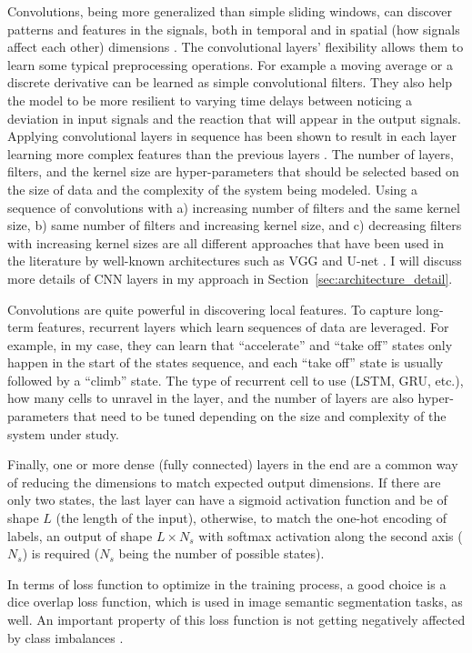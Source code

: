 Convolutions, being more generalized than simple sliding windows, can discover patterns and features in the signals, both in temporal and in spatial (how signals affect each other) dimensions \cite{wang2017time}. 
The convolutional layers' flexibility allows them to learn some typical preprocessing operations. For example a moving average or a discrete derivative can be learned as simple convolutional filters. They also help the model to be more resilient to varying time delays between noticing a deviation in input signals and the reaction that will appear in the output signals. Applying convolutional layers in sequence has been shown to result in each layer learning more complex features than the previous layers \cite{zeiler2014visualizing}.
The number of layers, filters, and the kernel size are hyper-parameters that should be selected based on the size of data and the complexity of the system being modeled.
Using a sequence of convolutions with a) increasing number of filters and the same kernel size, b) same number of filters and increasing kernel size, and c) decreasing filters with increasing kernel sizes are all different approaches that have been used in the literature by well-known architectures such as VGG and U-net \cite{simonyan2014very, ronneberger2015u}. 
I will discuss more details of CNN layers in my approach in Section~\ref{sec:architecture_detail}.

Convolutions are quite powerful in discovering local features. To capture long-term features, recurrent layers which learn sequences of data are leveraged. For example, in my case, they can learn that ``accelerate'' and ``take off'' states only happen in the start of the states sequence, and each ``take off'' state is usually followed by a ``climb'' state. The type of recurrent cell to use (LSTM, GRU, etc.), how many cells to unravel in the layer, and the number of layers are also hyper-parameters that need to be tuned depending on the size and complexity of the system under study.

Finally, one or more dense (fully connected) layers in the end are a common way of reducing the dimensions to match expected output dimensions. 
If there are only two states, the last layer can have a sigmoid activation function and be of shape $L$ (the length of the input), otherwise, to match the one-hot encoding of labels, an output of shape $L\times N_s$ with softmax activation along the second axis ($N_s$) is required ($N_s$ being the number of possible states).

In terms of loss function to optimize in the training process, a good choice is a dice overlap loss function, which is used in image semantic segmentation tasks, as well. An important property of this loss function is not getting negatively affected by class imbalances \cite{milletari2016v, sudre2017generalised}.

